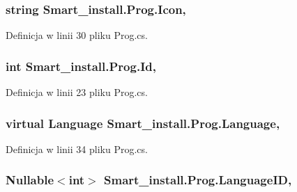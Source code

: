 \hypertarget{class_smart__install_1_1_prog_a897d5c26dbfb350ef8c270f46275122e}{
\subsubsection[{Icon}]{\setlength{\rightskip}{0pt plus 5cm}string Smart\+\_\+install.\+Prog.\+Icon\hspace{0.3cm}{\ttfamily [get]}, {\ttfamily [set]}}}\label{class_smart__install_1_1_prog_a897d5c26dbfb350ef8c270f46275122e}


Definicja w linii 30 pliku Prog.\+cs.

\hypertarget{class_smart__install_1_1_prog_aa2d0ae5b2e90aed283c33d2c31f2e0ea}{
\subsubsection[{Id}]{\setlength{\rightskip}{0pt plus 5cm}int Smart\+\_\+install.\+Prog.\+Id\hspace{0.3cm}{\ttfamily [get]}, {\ttfamily [set]}}}\label{class_smart__install_1_1_prog_aa2d0ae5b2e90aed283c33d2c31f2e0ea}


Definicja w linii 23 pliku Prog.\+cs.

\hypertarget{class_smart__install_1_1_prog_a74ca35d7e87453b35481b3709ac25605}{
\subsubsection[{Language}]{\setlength{\rightskip}{0pt plus 5cm}virtual {\bf Language} Smart\+\_\+install.\+Prog.\+Language\hspace{0.3cm}{\ttfamily [get]}, {\ttfamily [set]}}}\label{class_smart__install_1_1_prog_a74ca35d7e87453b35481b3709ac25605}


Definicja w linii 34 pliku Prog.\+cs.

\hypertarget{class_smart__install_1_1_prog_a42c854c682c1c2856bb3212930126cb7}{
\subsubsection[{Language\+I\+D}]{\setlength{\rightskip}{0pt plus 5cm}Nullable$<$int$>$ Smart\+\_\+install.\+Prog.\+Language\+I\+D\hspace{0.3cm}{\ttfamily [get]}, {\ttfamily [set]}}}\label{class_smart__install_1_1_prog_a42c854c682c1c2856bb3212930126cb7}


